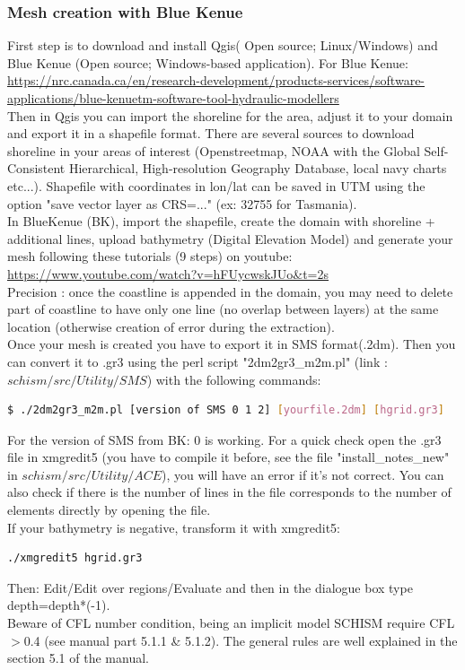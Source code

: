 \documentclass[preprints,briefreport,accept,oneauthor,pdftex]{Definitions/mdpi}
\begin{document}
\subsubsection{Mesh creation with Blue Kenue}
\noindent First step is to download and install Qgis( Open source; Linux/Windows) and Blue Kenue (Open source; Windows-based application). For Blue Kenue:\\
\url{https://nrc.canada.ca/en/research-development/products-services/software-applications/blue-kenuetm-software-tool-hydraulic-modellers}\\
Then in Qgis you can import the shoreline for the area, adjust it to your domain and export it in a shapefile format. There are several sources to download shoreline in your areas of interest (Openstreetmap, NOAA with the Global Self-Consistent Hierarchical, High-resolution Geography Database, local navy charts etc...). Shapefile with coordinates in lon/lat can be saved in UTM using the option "save vector layer as CRS=..." (ex: 32755 for Tasmania).\\
In BlueKenue (BK), import the shapefile, create the domain with shoreline + additional lines, upload bathymetry (Digital Elevation Model) and generate your mesh following these tutorials (9 steps) on youtube:\\
\url{https://www.youtube.com/watch?v=hFUycwskJUo&t=2s}\\

Precision : once the coastline is appended in the domain, you may need to delete part of coastline to have only one line (no overlap between layers) at the same location (otherwise creation of error during the extraction).\\
Once your mesh is created you have to export it in SMS format(.2dm). Then you can convert it to .gr3 using the perl script "2dm2gr3\_m2m.pl" (link : $schism/src/Utility/SMS$) with the following commands:
\begin{lstlisting}[language=bash]
$ ./2dm2gr3_m2m.pl [version of SMS 0 1 2] [yourfile.2dm] [hgrid.gr3]
\end{lstlisting}
For the version of SMS from BK: 0 is working. For a quick check open the .gr3 file in  
xmgredit5 (you have to compile it before, see the file "install\_notes\_new" in $schism/src/Utility/ACE$), you will have an error if it's not correct. You can also check if there is the number of lines in the file corresponds to the number of elements directly by opening the file. \\
If your bathymetry is negative, transform it with xmgredit5:
\begin{lstlisting}[language=bash]
./xmgredit5 hgrid.gr3
\end{lstlisting}
Then: Edit/Edit over regions/Evaluate and then in the dialogue box type depth=depth*(-1).\\
Beware of CFL number condition, being an implicit model SCHISM require CFL$>$0.4 (see manual part 5.1.1 \& 5.1.2). The general rules are well explained in the section 5.1 of the manual.
\end{document}
